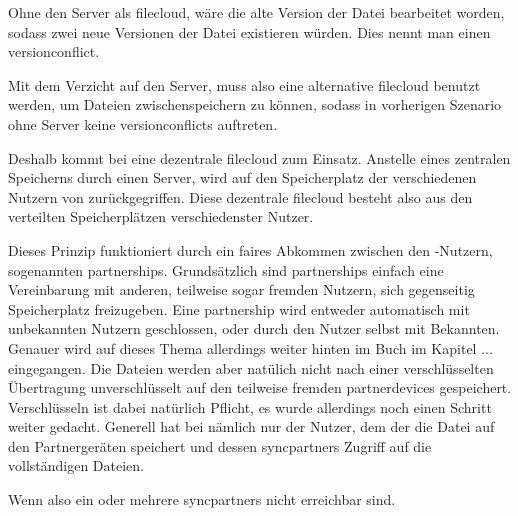 Ohne den Server als \gls{filecloud}, wäre die alte Version der Datei bearbeitet worden, sodass zwei
neue Versionen der Datei existieren würden. Dies nennt man einen \gls{versionconflict}.

Mit dem Verzicht auf den Server, muss also eine alternative \gls{filecloud} benutzt
werden, um Dateien zwischenspeichern zu können, sodass in vorherigen Szenario ohne Server
keine \glspl{versionconflict} auftreten.

Deshalb kommt bei \sblit eine dezentrale \gls{filecloud} zum Einsatz. Anstelle
eines zentralen Speicherns durch einen Server, wird auf den Speicherplatz der
verschiedenen Nutzern von \sblit zurückgegriffen. Diese dezentrale \gls{filecloud}
besteht also aus den verteilten Speicherplätzen verschiedenster Nutzer.

Dieses Prinzip funktioniert durch ein faires Abkommen zwischen den \sblit-Nutzern,
sogenannten \glspl{partnership}. Grundsätzlich sind \glspl{partnership} einfach eine
Vereinbarung mit anderen, teilweise sogar fremden Nutzern, sich gegenseitig Speicherplatz
freizugeben. Eine \gls{partnership} wird entweder automatisch mit unbekannten Nutzern
geschlossen, oder durch den Nutzer selbst mit Bekannten. Genauer wird auf dieses Thema allerdings weiter hinten im Buch im
Kapitel ... eingegangen.
Die Dateien werden aber natülich nicht nach einer verschlüsselten Übertragung unverschlüsselt
auf den teilweise fremden \glspl{partnerdevice} gespeichert. Verschlüsseln ist dabei
natürlich Pflicht, es wurde allerdings noch einen Schritt weiter gedacht. Generell
hat bei \sblit nämlich nur der Nutzer, dem der die Datei auf den Partnergeräten speichert und
dessen \glspl{syncpartner} Zugriff auf die vollständigen Dateien.

Wenn also ein oder mehrere \glspl{syncpartner} nicht erreichbar sind.

